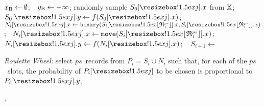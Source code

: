 %
%
\State $\mbox{\ensuremath{x_{\textnormal{B}}}}\gets\emptyset$;~~$\mbox{\ensuremath{y_{\textnormal{B}}}}\gets -\infty$;%
%
%
\State randomly sample $\listItem{S_0}{j}.\solution$ from $\mathbb{X}$;~~$\listItem{S_0}{j}.\oval \gets \objFunb{\listItem{S_0}{j}.\solution}$;%
\ %
\EndIf%
\EndFor%
%
%
%
%
\ $\listItem{N_i}{j}.\solution\gets\opBinary(\listItem{S_i}{\randomI{1}{ps}}.\solution,\listItem{S_i}{\randomI{1}{ps}}.\solution)$;%
\Else%
\ $\listItem{N_i}{j}.\solution\gets\opUnary(\listItem{S_i}{\randomI{1}{ps}}.\solution)$;%
\EndIf%
%
\State $\listItem{N_i}{j}.\oval \gets \objFunb{\listItem{N_i}{j}.\solution}$;%
\ %
\EndIf%
\EndFor%
%
\State $S_{i+1}\gets$\ \parbox[t]{0.75\linewidth}{\emph{Roulette Wheel:} select $ps$~records from $P_i=S_i\cup N_i$ such that, for each of the $ps$~slots, the probability of $\listItem{P_i}{j}$ to be chosen is proportional to $\listItem{P_i}{j}.\oval$.}%
%
\EndFor%
\Return \bestSoFarX, \bestSoFarF%
\EndProcedure%